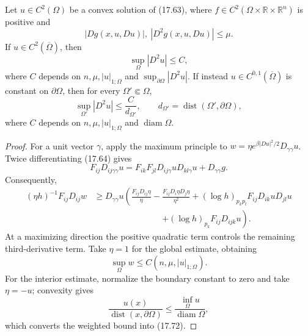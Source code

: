 \begin{theorem}
\label{gt-ch17-thm-monge-ampere-second-derivative-bounds}
Let $u\in C^2(\Omega)$ be a convex solution of (17.63), where
$f\in C^2(\Omega\times\mathbb R\times\mathbb R^n)$ is positive and
\begin{equation}\tag{17.68}
|Dg(x,u,Du)|,\ |D^2g(x,u,Du)|\le\mu.
\end{equation}
If $u\in C^2(\overline\Omega)$, then
\begin{equation}\tag{17.71}
\sup_\Omega|D^2u|\le C,
\end{equation}
where $C$ depends on $n,\mu,|u|_{1;\Omega}$ and
$\sup_{\partial\Omega}|D^2u|$.  If instead
$u\in C^{0,1}(\overline\Omega)$ is constant on $\partial\Omega$, then for
every $\Omega'\Subset\Omega$,
\begin{equation}\tag{17.72}
\sup_{\Omega'}|D^2u|\le\frac C{d_{\Omega'}},
\qquad d_{\Omega'}=\operatorname{dist}(\Omega',\partial\Omega),
\end{equation}
where $C$ depends on $n,\mu,|u|_{1;\Omega}$ and
$\operatorname{diam}\Omega$.
\end{theorem}
\begin{proof}
\sketch For a unit vector $\gamma$, apply the maximum principle to
$w=\eta e^{\beta|Du|^2/2}D_{\gamma\gamma}u$. Twice differentiating (17.64)
gives
\begin{equation}
\tag{17.66}
F_{ij}D_{ij\gamma\gamma}u
=F_{ik}F_{jl}D_{ij\gamma}uD_{kl\gamma}u+D_{\gamma\gamma}g.
\end{equation}
Consequently,
\begin{equation}
\tag{17.67}
\begin{aligned}
(\eta h)^{-1}F_{ij}D_{ij}w
&\geq D_{\gamma\gamma}u\left(
\frac{F_{ij}D_{ij}\eta}{\eta}
-\frac{F_{ij}D_i\eta D_j\eta}{\eta^2}
+(\log h)_{p_kp_l}F_{ij}D_{ik}uD_{jl}u\right.\\
&\hspace{8em}\left.+(\log h)_{p_k}F_{ij}D_{ijk}u\right).
\end{aligned}
\end{equation}
At a maximizing direction the positive quadratic term
controls the remaining third-derivative term.  Take $\eta=1$ for the global
estimate, obtaining
\begin{equation}
\tag{17.69}
\sup_\Omega w\leq C(n,\mu,|u|_{1;\Omega}).
\end{equation}
For the interior estimate, normalize the boundary constant to
zero and take $\eta=-u$; convexity gives
\[
\frac{u(x)}{\operatorname{dist}(x,\partial\Omega)}
\le\frac{\inf_\Omega u}{\operatorname{diam}\Omega},
\tag{17.70}
\]
which converts the weighted bound into (17.72).
\end{proof}

